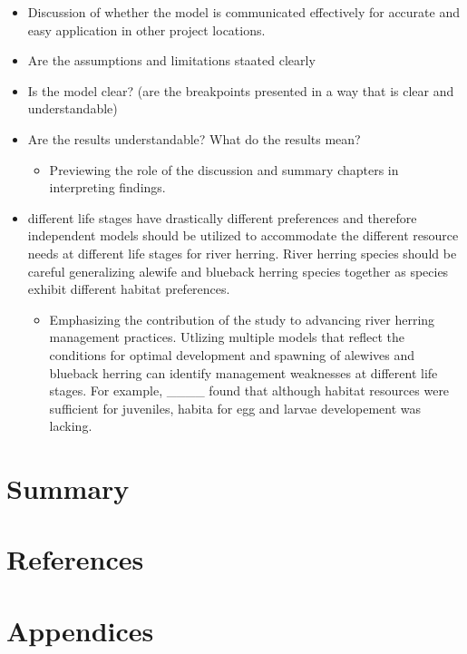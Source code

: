 \documentclass[
]{book}
\providecommand{\tightlist}{%
  \setlength{\itemsep}{0pt}\setlength{\parskip}{0pt}}
\begin{document}
\begin{itemize}
\item
  Discussion of whether the model is communicated effectively for accurate and easy application in other project locations.
\item
  Are the assumptions and limitations staated clearly
\item
  Is the model clear? (are the breakpoints presented in a way that is clear and understandable)
\item
  Are the results understandable? What do the results mean?

  \begin{itemize}
  \tightlist
  \item
    Previewing the role of the discussion and summary chapters in interpreting findings.
  \end{itemize}
\item
  different life stages have drastically different preferences and therefore independent models should be utilized to accommodate the different resource needs at different life stages for river herring. River herring species should be careful generalizing alewife and blueback herring species together as species exhibit different habitat preferences.

  \begin{itemize}
  \tightlist
  \item
    Emphasizing the contribution of the study to advancing river herring management practices.
    Utlizing multiple models that reflect the conditions for optimal development and spawning of alewives and blueback herring can identify management weaknesses at different life stages. For example, \_\_\_\_ found that although habitat resources were sufficient for juveniles, habita for egg and larvae developement was lacking.
  \end{itemize}
\end{itemize}

\hypertarget{summary}{%
\chapter{Summary}\label{summary}}

\hypertarget{references}{%
\chapter*{References}\label{references}}

\hypertarget{appendices}{%
\chapter*{Appendices}\label{appendices}}
\end{document}
